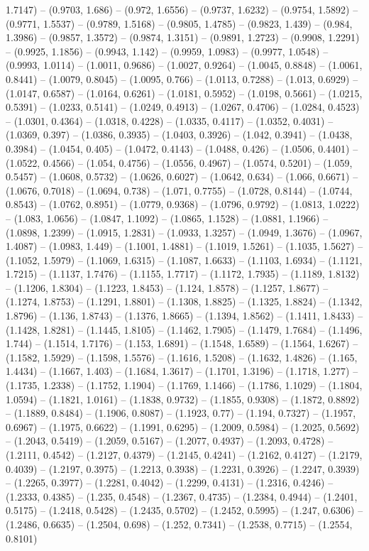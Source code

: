 1.7147) -- (0.9703, 1.686) -- (0.972, 1.6556) -- (0.9737, 1.6232) -- (0.9754, 1.5892) -- (0.9771, 1.5537) -- (0.9789, 1.5168) -- (0.9805, 1.4785) -- (0.9823, 1.439) -- (0.984, 1.3986) -- (0.9857, 1.3572) -- (0.9874, 1.3151) -- (0.9891, 1.2723) -- (0.9908, 1.2291) -- (0.9925, 1.1856) -- (0.9943, 1.142) -- (0.9959, 1.0983) -- (0.9977, 1.0548) -- (0.9993, 1.0114) -- (1.0011, 0.9686) -- (1.0027, 0.9264) -- (1.0045, 0.8848) -- (1.0061, 0.8441) -- (1.0079, 0.8045) -- (1.0095, 0.766) -- (1.0113, 0.7288) -- (1.013, 0.6929) -- (1.0147, 0.6587) -- (1.0164, 0.6261) -- (1.0181, 0.5952) -- (1.0198, 0.5661) -- (1.0215, 0.5391) -- (1.0233, 0.5141) -- (1.0249, 0.4913) -- (1.0267, 0.4706) -- (1.0284, 0.4523) -- (1.0301, 0.4364) -- (1.0318, 0.4228) -- (1.0335, 0.4117) -- (1.0352, 0.4031) -- (1.0369, 0.397) -- (1.0386, 0.3935) -- (1.0403, 0.3926) -- (1.042, 0.3941) -- (1.0438, 0.3984) -- (1.0454, 0.405) -- (1.0472, 0.4143) -- (1.0488, 0.426) -- (1.0506, 0.4401) -- (1.0522, 0.4566) -- (1.054, 0.4756) -- (1.0556, 0.4967) -- (1.0574, 0.5201) -- (1.059, 0.5457) -- (1.0608, 0.5732) -- (1.0626, 0.6027) -- (1.0642, 0.634) -- (1.066, 0.6671) -- (1.0676, 0.7018) -- (1.0694, 0.738) -- (1.071, 0.7755) -- (1.0728, 0.8144) -- (1.0744, 0.8543) -- (1.0762, 0.8951) -- (1.0779, 0.9368) -- (1.0796, 0.9792) -- (1.0813, 1.0222) -- (1.083, 1.0656) -- (1.0847, 1.1092) -- (1.0865, 1.1528) -- (1.0881, 1.1966) -- (1.0898, 1.2399) -- (1.0915, 1.2831) -- (1.0933, 1.3257) -- (1.0949, 1.3676) -- (1.0967, 1.4087) -- (1.0983, 1.449) -- (1.1001, 1.4881) -- (1.1019, 1.5261) -- (1.1035, 1.5627) -- (1.1052, 1.5979) -- (1.1069, 1.6315) -- (1.1087, 1.6633) -- (1.1103, 1.6934) -- (1.1121, 1.7215) -- (1.1137, 1.7476) -- (1.1155, 1.7717) -- (1.1172, 1.7935) -- (1.1189, 1.8132) -- (1.1206, 1.8304) -- (1.1223, 1.8453) -- (1.124, 1.8578) -- (1.1257, 1.8677) -- (1.1274, 1.8753) -- (1.1291, 1.8801) -- (1.1308, 1.8825) -- (1.1325, 1.8824) -- (1.1342, 1.8796) -- (1.136, 1.8743) -- (1.1376, 1.8665) -- (1.1394, 1.8562) -- (1.1411, 1.8433) -- (1.1428, 1.8281) -- (1.1445, 1.8105) -- (1.1462, 1.7905) -- (1.1479, 1.7684) -- (1.1496, 1.744) -- (1.1514, 1.7176) -- (1.153, 1.6891) -- (1.1548, 1.6589) -- (1.1564, 1.6267) -- (1.1582, 1.5929) -- (1.1598, 1.5576) -- (1.1616, 1.5208) -- (1.1632, 1.4826) -- (1.165, 1.4434) -- (1.1667, 1.403) -- (1.1684, 1.3617) -- (1.1701, 1.3196) -- (1.1718, 1.277) -- (1.1735, 1.2338) -- (1.1752, 1.1904) -- (1.1769, 1.1466) -- (1.1786, 1.1029) -- (1.1804, 1.0594) -- (1.1821, 1.0161) -- (1.1838, 0.9732) -- (1.1855, 0.9308) -- (1.1872, 0.8892) -- (1.1889, 0.8484) -- (1.1906, 0.8087) -- (1.1923, 0.77) -- (1.194, 0.7327) -- (1.1957, 0.6967) -- (1.1975, 0.6622) -- (1.1991, 0.6295) -- (1.2009, 0.5984) -- (1.2025, 0.5692) -- (1.2043, 0.5419) -- (1.2059, 0.5167) -- (1.2077, 0.4937) -- (1.2093, 0.4728) -- (1.2111, 0.4542) -- (1.2127, 0.4379) -- (1.2145, 0.4241) -- (1.2162, 0.4127) -- (1.2179, 0.4039) -- (1.2197, 0.3975) -- (1.2213, 0.3938) -- (1.2231, 0.3926) -- (1.2247, 0.3939) -- (1.2265, 0.3977) -- (1.2281, 0.4042) -- (1.2299, 0.4131) -- (1.2316, 0.4246) -- (1.2333, 0.4385) -- (1.235, 0.4548) -- (1.2367, 0.4735) -- (1.2384, 0.4944) -- (1.2401, 0.5175) -- (1.2418, 0.5428) -- (1.2435, 0.5702) -- (1.2452, 0.5995) -- (1.247, 0.6306) -- (1.2486, 0.6635) -- (1.2504, 0.698) -- (1.252, 0.7341) -- (1.2538, 0.7715) -- (1.2554, 0.8101) 